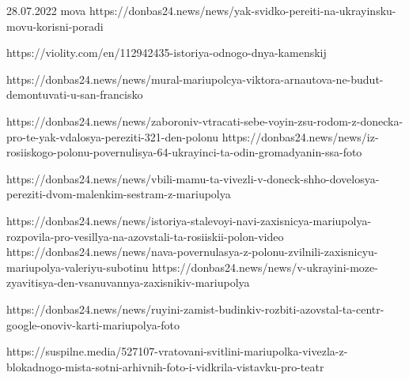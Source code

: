 28.07.2022 mova
https://donbas24.news/news/yak-svidko-pereiti-na-ukrayinsku-movu-korisni-poradi

https://violity.com/en/112942435-istoriya-odnogo-dnya-kamenskij

https://donbas24.news/news/mural-mariupolcya-viktora-arnautova-ne-budut-demontuvati-u-san-francisko

https://donbas24.news/news/zaboroniv-vtracati-sebe-voyin-zsu-rodom-z-donecka-pro-te-yak-vdalosya-pereziti-321-den-polonu
https://donbas24.news/news/iz-rosiiskogo-polonu-povernulisya-64-ukrayinci-ta-odin-gromadyanin-ssa-foto

https://donbas24.news/news/vbili-mamu-ta-vivezli-v-doneck-shho-dovelosya-pereziti-dvom-malenkim-sestram-z-mariupolya

https://donbas24.news/news/istoriya-stalevoyi-navi-zaxisnicya-mariupolya-rozpovila-pro-vesillya-na-azovstali-ta-rosiiskii-polon-video
https://donbas24.news/news/nava-povernulasya-z-polonu-zvilnili-zaxisnicyu-mariupolya-valeriyu-subotinu
https://donbas24.news/news/v-ukrayini-moze-zyavitisya-den-vsanuvannya-zaxisnikiv-mariupolya

https://donbas24.news/news/ruyini-zamist-budinkiv-rozbiti-azovstal-ta-centr-google-onoviv-karti-mariupolya-foto


https://suspilne.media/527107-vratovani-svitlini-mariupolka-vivezla-z-blokadnogo-mista-sotni-arhivnih-foto-i-vidkrila-vistavku-pro-teatr

